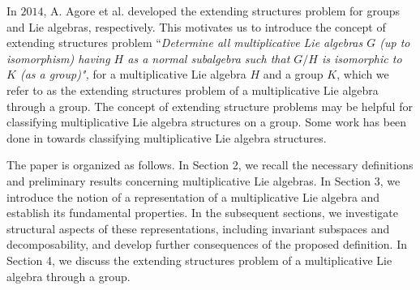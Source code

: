 \documentclass[10 pt,oneside,reqno,a4paper]{amsart}
\numberwithin{equation}{section}
\begin{document}
In $2014$, A. Agore et al. \cite{AG1, AG} developed the extending structures problem for groups and Lie algebras, respectively. This motivates us to introduce the concept of extending structures problem ``\textit{Determine all multiplicative Lie algebras $G$ (up to isomorphism) having $H$ as a normal subalgebra such that $G/H$ is isomorphic to $K$ (as a group)",} for a multiplicative Lie algebra $H$ and a group $K$, which we refer to as the extending structures problem of a multiplicative Lie algebra through a group. The concept of extending structure problems may be helpful for classifying multiplicative Lie algebra structures on a group. Some work has been done in \cite{KU, KP, MKU, PK, MS1, GW} towards classifying multiplicative Lie algebra structures.

The paper is organized as follows. In Section 2, we recall the necessary definitions and preliminary results concerning multiplicative Lie algebras. In Section 3, we introduce the notion of a representation of a multiplicative Lie algebra and establish its fundamental properties. In the subsequent sections, we investigate structural aspects of these representations, including invariant subspaces and decomposability, and develop further consequences of the proposed definition. In Section 4, we discuss the extending structures problem of a multiplicative Lie algebra through a group.

\end{document}
